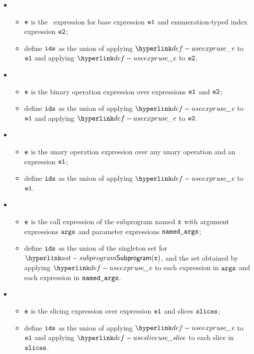 \begin{itemize}
  \item {}
  \begin{itemize}
    \item $\texttt{e}$ is the \arrayaccess\ expression for base expression $\texttt{e1}$ and enumeration-typed index expression $\texttt{e2}$;
    \item define $\texttt{ids}$ as the union of applying $\useexpr$ to $\texttt{e1}$ and applying $\useexpr$ to $\texttt{e2}$.
  \end{itemize}

  \item {}
  \begin{itemize}
    \item $\texttt{e}$ is the binary operation expression over expressions $\texttt{e1}$ and $\texttt{e2}$;
    \item define $\texttt{ids}$ as the union of applying $\useexpr$ to $\texttt{e1}$ and applying $\useexpr$ to $\texttt{e2}$.
  \end{itemize}

  \item {}
  \begin{itemize}
    \item $\texttt{e}$ is the unary operation expression over any unary operation and an expression $\texttt{e1}$;
    \item define $\texttt{ids}$ as the union of applying $\useexpr$ to $\texttt{e1}$.
  \end{itemize}

  \item {}
  \begin{itemize}
    \item $\texttt{e}$ is the call expression of the subprogram named $\texttt{x}$ with argument expressions $\texttt{args}$ and parameter expressions $\texttt{named\_args}$;
    \item define $\texttt{ids}$ as the union of the singleton set for $\Subprogram(\vx)$, and the set obtained by applying $\useexpr$ to each expression in
          $\texttt{args}$ and each expression in $\texttt{named\_args}$.
  \end{itemize}

  \item {}
  \begin{itemize}
    \item $\texttt{e}$ is the slicing expression over expression $\texttt{e1}$ and slices $\texttt{slices}$;
    \item define $\texttt{ids}$ as the union of applying $\useexpr$ to $\texttt{e1}$ and applying $\useslice$ to each slice in $\texttt{slices}$.
  \end{itemize}


\end{itemize}
